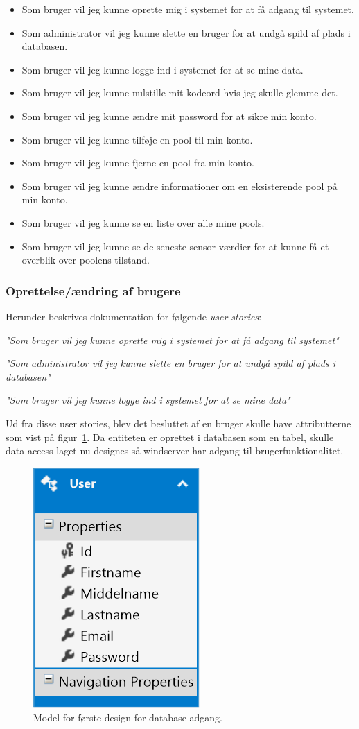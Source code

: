 \begin{itemize}
	\item Som bruger vil jeg kunne oprette mig i systemet for at få adgang til systemet.
	\item Som administrator vil jeg kunne slette en bruger for at undgå spild af plads i databasen.
	\item Som bruger vil jeg kunne logge ind i systemet for at se mine data.
	\item Som bruger vil jeg kunne nulstille mit kodeord hvis jeg skulle glemme det.
	\item Som bruger vil jeg kunne ændre mit password for at sikre min konto.
	\item Som bruger vil jeg kunne tilføje en pool til min konto.
	\item Som bruger vil jeg kunne fjerne en pool fra min konto.
	\item Som bruger vil jeg kunne ændre informationer om en eksisterende pool på min konto.
	\item Som bruger vil jeg kunne se en liste over alle mine pools.
	\item Som bruger vil jeg kunne se de seneste sensor værdier for at kunne få et overblik over poolens tilstand.
\end{itemize}

\subsubsection{Oprettelse/ændring af brugere}
Herunder beskrives dokumentation for følgende \textit{user stories}:

\textit{"Som bruger vil jeg kunne oprette mig i systemet for at få adgang til systemet"}

\textit{"Som administrator vil jeg kunne slette en bruger for at undgå spild af plads i databasen"}

\textit{"Som bruger vil jeg kunne logge ind i systemet for at se mine data"}

Ud fra disse user stories, blev det besluttet af en bruger skulle have attributterne som vist på figur~\ref{fig:database_model_1}. Da entiteten er oprettet i databasen som en tabel, skulle data access laget nu designes så \gls{windserver} har adgang til brugerfunktionalitet.


\begin{figure}[H]
	\centering
	\includegraphics[width=0.25\linewidth]{figs/design/database_model_1}
	\caption{Model for første design for database-adgang.}
	\label{fig:database_model_1}
\end{figure}

